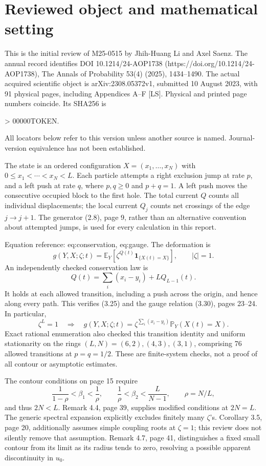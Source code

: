 \documentclass[10pt]{article}
\begin{document}
\section*{Reviewed object and mathematical setting}
This is the initial review of M25-0515 by Jhih-Huang Li and Axel Saenz. The annual record identifies DOI 10.1214/24-AOP1738 (https://doi.org/10.1214/24-AOP1738), The Annals of Probability 53(4) (2025), 1434–1490. The actual acquired scientific object is arXiv:2308.05372v1, submitted 10 August 2023, with 91 physical pages, including Appendices A–F [LS]. Physical and printed page numbers coincide. Its SHA256 is\par
> 00000TOKEN.\par
All locators below refer to this version unless another source is named. Journal-version equivalence has not been established.\par
The state is an ordered configuration \(X=(x_1,\ldots,x_N)\) with \(0\leq x_1<\cdots<x_N<L\). Each particle attempts a right exclusion jump at rate \(p\), and a left push at rate \(q\), where \(p,q\geq0\) and \(p+q=1\). A left push moves the consecutive occupied block to the first hole. The total current \(Q\) counts all individual displacements; the local current \(Q_j\) counts net crossings of the edge \(j\to j+1\). The generator (2.8), page 9, rather than an alternative convention about attempted jumps, is used for every calculation in this report.\par
Equation reference: eq:conservation, eq:gauge. The deformation is \[g(Y,X;\zeta;t)=\mathbb E_Y[\zeta^{Q(t)}\mathbf1_{\{X(t)=X\}}],
 \qquad |\zeta|=1.\] An independently checked conservation law is \[
 Q(t)=\sum_i(x_i-y_i)+LQ_{L-1}(t).\] It holds at each allowed transition, including a push across the origin, and hence along every path. This verifies (3.25) and the gauge relation (3.30), pages 23–24. In particular, \[
 \zeta^L=1\quad\Longrightarrow\quad
 g(Y,X;\zeta;t)=\zeta^{\sum_i(x_i-y_i)}
 \mathbb P_Y(X(t)=X).\] Exact rational enumeration also checked this transition identity and uniform stationarity on the rings \((L,N)=(6,2),(4,3),(3,1)\), comprising 76 allowed transitions at \(p=q=1/2\). These are finite-system checks, not a proof of all contour or asymptotic estimates.\par
The contour conditions on page 15 require \[\frac{1}{1-\rho}<\beta_1<\frac1\rho,\qquad
 \frac1\rho<\beta_2<\frac{L}{N-1},\qquad \rho=N/L,\] and thus \(2N<L\). Remark 4.4, page 39, supplies modified conditions at \(2N=L\). The generic spectral expansion explicitly excludes finitely many \(\zeta\)’s. Corollary 3.5, page 20, additionally assumes simple coupling roots at \(\zeta=1\); this review does not silently remove that assumption. Remark 4.7, page 41, distinguishes a fixed small contour from its limit as its radius tends to zero, resolving a possible apparent discontinuity in \(u_0\).\par
\end{document}

